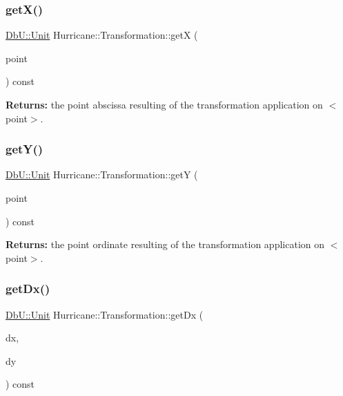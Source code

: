 \subsubsection{\texorpdfstring{get\+X()}{getX()}\hspace{0.1cm}{\footnotesize\ttfamily [2/2]}}
{\footnotesize\ttfamily \mbox{\hyperlink{group__DbUGroup_ga4fbfa3e8c89347af76c9628ea06c4146}{Db\+U\+::\+Unit}} Hurricane\+::\+Transformation\+::getX (\begin{DoxyParamCaption}\item[{const \mbox{\hyperlink{classHurricane_1_1Point}{Point}} \&}]{point }\end{DoxyParamCaption}) const}

{\bfseries Returns\+:} the point abscissa resulting of the transformation application on {\ttfamily $<$point$>$}. \mbox{\label{classHurricane_1_1Transformation_a87152b7b585cf409950e9aba878143d5}} 
\subsubsection{\texorpdfstring{get\+Y()}{getY()}\hspace{0.1cm}{\footnotesize\ttfamily [2/2]}}
{\footnotesize\ttfamily \mbox{\hyperlink{group__DbUGroup_ga4fbfa3e8c89347af76c9628ea06c4146}{Db\+U\+::\+Unit}} Hurricane\+::\+Transformation\+::getY (\begin{DoxyParamCaption}\item[{const \mbox{\hyperlink{classHurricane_1_1Point}{Point}} \&}]{point }\end{DoxyParamCaption}) const}

{\bfseries Returns\+:} the point ordinate resulting of the transformation application on {\ttfamily $<$point$>$}. \mbox{\label{classHurricane_1_1Transformation_a2c20ee8506ad770a28c2e2b91e9b0153}} 
\subsubsection{\texorpdfstring{get\+Dx()}{getDx()}}
{\footnotesize\ttfamily \mbox{\hyperlink{group__DbUGroup_ga4fbfa3e8c89347af76c9628ea06c4146}{Db\+U\+::\+Unit}} Hurricane\+::\+Transformation\+::get\+Dx (\begin{DoxyParamCaption}\item[{const \mbox{\hyperlink{group__DbUGroup_ga4fbfa3e8c89347af76c9628ea06c4146}{Db\+U\+::\+Unit}} \&}]{dx,  }\item[{const \mbox{\hyperlink{group__DbUGroup_ga4fbfa3e8c89347af76c9628ea06c4146}{Db\+U\+::\+Unit}} \&}]{dy }\end{DoxyParamCaption}) const}

